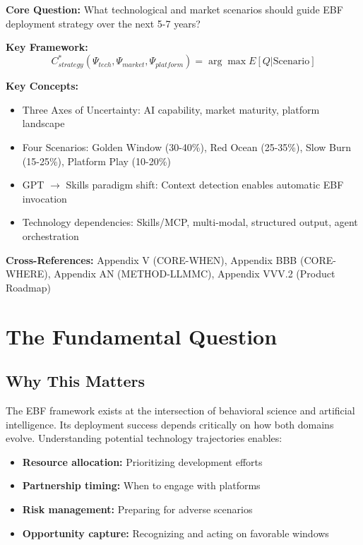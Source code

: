 \begin{tcolorbox}[colback=blue!5!white, colframe=blue!75!black,
    title=Quick Reference: Technological Roadmap]

\textbf{Core Question:} What technological and market scenarios should guide
EBF deployment strategy over the next 5-7 years?

\textbf{Key Framework:}
\begin{equation}
C^*_{strategy}(\Psi_{tech}, \Psi_{market}, \Psi_{platform}) = \arg\max E[Q | \text{Scenario}]
\end{equation}

\textbf{Key Concepts:}
\begin{itemize}[nosep]
\item Three Axes of Uncertainty: AI capability, market maturity, platform landscape
\item Four Scenarios: Golden Window (30-40\%), Red Ocean (25-35\%), Slow Burn (15-25\%), Platform Play (10-20\%)
\item GPT $\to$ Skills paradigm shift: Context detection enables automatic EBF invocation
\item Technology dependencies: Skills/MCP, multi-modal, structured output, agent orchestration
\end{itemize}

\textbf{Cross-References:} Appendix V (CORE-WHEN), Appendix BBB (CORE-WHERE),
Appendix AN (METHOD-LLMMC), Appendix VVV.2 (Product Roadmap)
\end{tcolorbox}

\section{The Fundamental Question}
\label{sec:vvv1-fundamental}

\subsection{Why This Matters}

The EBF framework exists at the intersection of behavioral science and
artificial intelligence. Its deployment success depends critically on
how both domains evolve. Understanding potential technology trajectories
enables:
\begin{itemize}
    \item \textbf{Resource allocation:} Prioritizing development efforts
    \item \textbf{Partnership timing:} When to engage with platforms
    \item \textbf{Risk management:} Preparing for adverse scenarios
    \item \textbf{Opportunity capture:} Recognizing and acting on favorable windows
\end{itemize}

